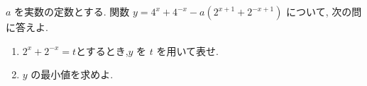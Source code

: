 \documentclass[8pt,dvipdfmx]{article}[b5paper]
\begin{document}
\begin{tcolorbox}[title=数学\textcircled{2} 1-6 C]
\( a \) を実数の定数とする. 関数 \( y = 4^{x} + 4^{-x} - a(2^{x+1} + 2^{-x+1}) \) について, 次の問に答えよ.
\begin{enumerate}[(1)]
    \item \( 2^{x}+2^ {- x}=t \)とするとき,\( y \) を \( t \) を用いて表せ.
    \item \( y \) の最小値を求めよ.
\end{enumerate}
\end{tcolorbox}




\end{document}
